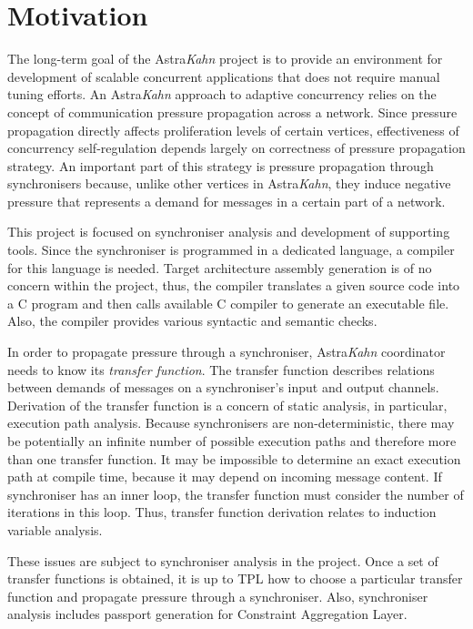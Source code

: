     \section{Motivation}
The long-term goal of the Astra\emph{Kahn} project is to provide an environment for development of scalable concurrent applications that does not require manual tuning efforts. An Astra\emph{Kahn} approach to adaptive concurrency relies on the concept of communication pressure propagation across a network. Since pressure propagation directly affects proliferation levels of certain vertices, effectiveness of concurrency self-regulation depends largely on correctness of pressure propagation strategy. An important part of this strategy is pressure propagation through synchronisers because, unlike other vertices in Astra\emph{Kahn}, they induce negative pressure that represents a demand for messages in a certain part of a network.

This project is focused on synchroniser analysis and development of supporting tools. Since the synchroniser is programmed in a dedicated language, a compiler for this language is needed. Target architecture assembly generation is of no concern within the project, thus, the compiler translates a given source code into a C program and then calls available C compiler to generate an executable file. Also, the compiler provides various syntactic and semantic checks.

In order to propagate pressure through a synchroniser, Astra\emph{Kahn} coordinator needs to know its \emph{transfer function}. The transfer function describes relations between demands of messages on a synchroniser's input and output channels. Derivation of the transfer function is a concern of static analysis, in particular, execution path analysis. Because synchronisers are non-deterministic, there may be potentially an infinite number of possible execution paths and therefore more than one transfer function. It may be impossible to determine an exact execution path at compile time, because it may depend on incoming message content. If synchroniser has an inner loop, the transfer function must consider the number of iterations in this loop. Thus, transfer function derivation relates to induction variable analysis.

These issues are subject to synchroniser analysis in the project. Once a set of transfer functions is obtained, it is up to TPL how to choose a particular transfer function and propagate pressure through a synchroniser. Also, synchroniser analysis includes passport generation for Constraint Aggregation Layer.


